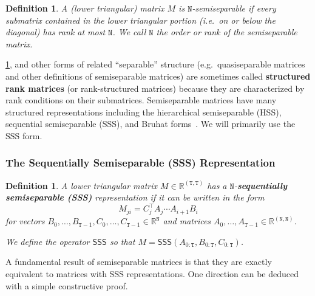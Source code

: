 \documentclass{article}
\newcommand{\citep}{\parencite}
\newtheorem{definition}[theorem]{Definition}
\newcommand{\R}{\mathbb{R}}
\begin{document}
\begin{definition}
  \label{def:semiseparable-rank}
  A (lower triangular) matrix $M$ is $\mathtt{N}$-semiseparable if every submatrix contained in the lower triangular portion (i.e.\ on or below the diagonal) has rank at most $\mathtt{N}$.
  We call $\mathtt{N}$ the \emph{order} or \emph{rank} of the semiseparable matrix.
\end{definition}

\cref{def:semiseparable-rank}, and other forms of related ``separable'' structure (e.g.\ quasiseparable matrices and other definitions of semiseparable matrices) are sometimes called \textbf{structured rank matrices} (or rank-structured matrices) because they are characterized by rank conditions on their submatrices.
Semiseparable matrices have many structured representations including the hierarchical semiseparable (HSS),
sequential semiseparable (SSS), and Bruhat forms~\citep{pernet2018time}.
We will primarily use the SSS form.

\subsubsection{The Sequentially Semiseparable (SSS) Representation}

\begin{definition}
  \label{def:sss}
  A lower triangular matrix $M \in \R^{\mathtt{(T,T)}}$ has a $\mathtt{N}$-\textbf{sequentially semiseparable (SSS)} representation if it can be written in the form
  \begin{equation}
    \label{eq:sss}
    M_{ji} = C_j^{\top} A_{j} \cdots A_{i+1} B_{i}
  \end{equation}
  for vectors $B_{0}, \dots, B_{\mathtt{T}-1}, C_{0}, \dots, C_{\mathtt{T}-1} \in \R^{\mathtt{N}}$
  and matrices $A_{0}, \dots, A_{\mathtt{T}-1} \in \R^{\mathtt{(N,N)}}$.

  We define the operator $\mathsf{SSS}$ so that $M = \mathsf{SSS}(A_{0:\mathtt{T}}, B_{0:\mathtt{T}}, C_{0:\mathtt{T}})$.
\end{definition}

A fundamental result of semiseparable matrices is that they are exactly equivalent to matrices with SSS representations.
One direction can be deduced with a simple constructive proof.
\end{document}
